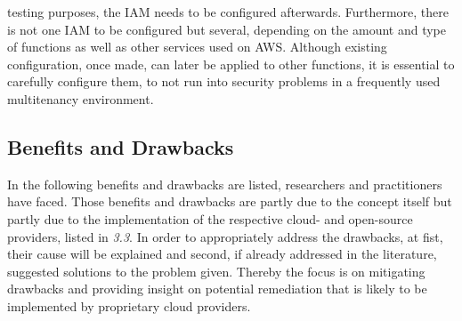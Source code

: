\documentclass[a4paper,11pt, pagesize]{scrartcl}
\begin{document}
\begin{spacing}{1.2}
testing purposes, the IAM needs to be configured afterwards. Furthermore, there is not one IAM to be configured but several, depending on the amount and type of functions as well as other services used on AWS. Although existing configuration, once made, can later be applied to other functions, it is essential to carefully configure them, to not run into security problems in a frequently used multitenancy environment.
\subsection{Benefits and Drawbacks}
In the following benefits and drawbacks are listed, researchers and practitioners have faced. Those benefits and drawbacks are partly due to the concept itself but partly due to the implementation of the respective cloud- and open-source providers, listed in \textit{3.3}. In order to appropriately address the drawbacks, at fist, their cause will be explained and second, if already addressed in the literature, suggested solutions to the problem given. Thereby the focus is on mitigating drawbacks and providing insight on potential remediation that is likely to be implemented by proprietary cloud providers.

\end{spacing}
\end{document}
